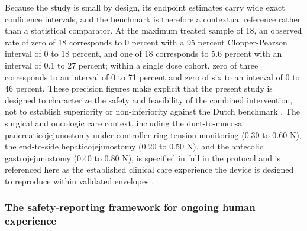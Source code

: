 Because the study is small by design, its endpoint estimates carry wide exact
confidence intervals, and the benchmark is therefore a contextual reference rather
than a statistical comparator. At the maximum treated sample of 18, an observed
rate of zero of 18 corresponds to 0 percent with a 95 percent Clopper-Pearson
interval of 0 to 18 percent, and one of 18 corresponds to 5.6 percent with an
interval of 0.1 to 27 percent; within a single dose cohort, zero of three
corresponds to an interval of 0 to 71 percent and zero of six to an interval of 0
to 46 percent. These precision figures make explicit that the present study is
designed to characterize the safety and feasibility of the combined intervention,
not to establish superiority or non-inferiority against the Dutch benchmark
\cite{phase1guidance}. The surgical and oncologic care context, including the
duct-to-mucosa pancreaticojejunostomy under controller ring-tension monitoring
(0.30 to 0.60 N), the end-to-side hepaticojejunostomy (0.20 to 0.50 N), and the
antecolic gastrojejunostomy (0.40 to 0.80 N), is specified in full in the protocol
and is referenced here as the established clinical care experience the device is
designed to reproduce within validated envelopes \cite{onpremwhippl}.

\subsubsection*{The safety-reporting framework for ongoing human experience}


